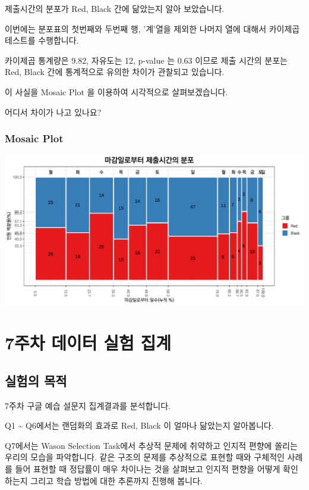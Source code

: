 \documentclass[
]{book}
\begin{document}
제출시간의 분포가 Red, Black 간에 닮았는지 알아 보았습니다.

이번에는 분포표의 첫번째와 두번째 행, '계'열을 제외한 나머지 열에 대해서 카이제곱테스트를 수행합니다.

카이제곱 통계량은 9.82, 자유도는 12, p-value 는 0.63 이므로 제출 시간의 분포는 Red, Black 간에 통계적으로 유의한 차이가 관찰되고 있습니다.

이 사실을 Mosaic Plot 을 이용하여 시각적으로 살펴보겠습니다.

어디서 차이가 나고 있나요?

\subsection{Mosaic Plot}\label{mosaic-plot-11}

\includegraphics{_main_files/figure-latex/unnamed-chunk-167-1.pdf}

\chapter{7주차 데이터 실험 집계}\label{uxc8fcuxcc28-uxb370uxc774uxd130-uxc2e4uxd5d8-uxc9d1uxacc4-6}

\section{실험의 목적}\label{uxc2e4uxd5d8uxc758-uxbaa9uxc801-6}

7주차 구글 예습 설문지 집계결과를 분석합니다.

Q1 \textasciitilde{} Q6에서는 랜덤화의 효과로 Red, Black 이 얼마나 닮았는지 알아봅니다.

Q7에서는 Wason Selection Task에서 추상적 문제에 취약하고 인지적 편향에 쏠리는 우리의 모습을 파악합니다. 같은 구조의 문제를 추상적으로 표현할 때와 구체적인 사례를 들어 표현할 때 정답률이 매우 차이나는 것을 살펴보고 인지적 편향을 어떻게 확인하는지 그리고 학습 방법에 대한 추론까지 진행해 봅니다.
\end{document}
